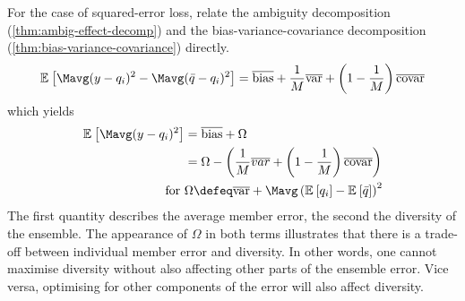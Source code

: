 \documentclass[../main.tex]{subfiles}
\begin{document}
For the case of squared-error loss, \citeauthor{brown_ManagingDiversityRegression_2005} \cite{brown_ManagingDiversityRegression_2005} relate the ambiguity decomposition (\cf \ref{thm:ambig-effect-decomp}) and the bias-variance-covariance decomposition (\cf \ref{thm:bias-variance-covariance}) directly. 
\begin{align*}
\mathbb{E}_{}\left[ \Mavg (y - q_{i})^2 - \Mavg (\bar{q} - q_{i})^2 \right]  = \overline{\text{bias} } + \frac{1}{M} \overline{\text{var} } + \left( 1 - \frac{1}{M} \right) \overline{\text{covar} }
\end{align*}
which yields
\begin{align*}
\mathbb{E}_{}\left[ \Mavg (y - q_{i})^2 \right]  &= \overline{\text{bias} } + \Omega \\
&= \Omega - \left( \frac{1}{M}\overline{var} + \left( 1-\frac{1}{M} \right) \overline{\text{covar} } \right) \\
\text{for~}  & \Omega \defeq \overline{\text{var} } + \Mavg \left( \mathbb{E}_{}\left[ q_{i} \right] - \mathbb{E}_{}\left[ \bar{q} \right] \right)^2
\end{align*}
The first quantity describes the average member error, the second the diversity of the ensemble. The appearance of $\Omega$ in both terms illustrates that there is a trade-off between individual member error and diversity. 
In other words, one cannot maximise diversity without also affecting other parts of the ensemble error. Vice versa, optimising for other components of the error will also affect diversity.
\end{document}
